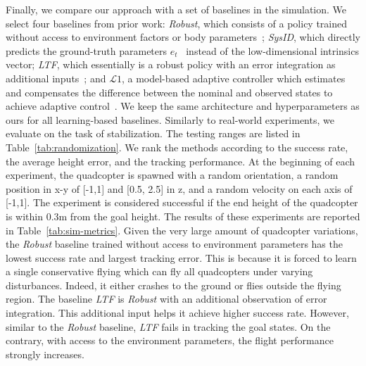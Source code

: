 Finally, we compare our approach with a set of baselines in the simulation.
%
We select four baselines from prior work: \emph{Robust}, which consists of a policy trained without access to environment factors or body parameters~\cite{tobin2017domain, peng2018sim}; \emph{SysID}, which directly predicts the ground-truth parameters $e_t$~\cite{SysID} instead of the low-dimensional intrinsics vector; \emph{LTF}, which essentially is a robust policy with an error integration as additional inputs~\cite{LTF}; and $\mathcal{L}1$, a model-based adaptive controller which estimates and compensates the difference between the nominal and observed states to achieve adaptive control~\cite{cao2008design,hovakimyan2010l1,hanover2021performance}. 
%
We keep the same architecture and hyperparameters as ours for all learning-based baselines. 
%
%
Similarly to real-world experiments, we evaluate on the task of stabilization. The testing ranges are listed in Table~\ref{tab:randomization}. We rank the methods according to the success rate, the average height error, and the tracking performance.
%
At the beginning of each experiment, the quadcopter is spawned with a random orientation, a random position in x-y of [-1,1] and [0.5, 2.5] in z, and a random velocity on each axis of [-1,1].
%
The experiment is considered successful if the end height of the quadcopter is within 0.3m from the goal height.
%
The results of these experiments are reported in Table~\ref{tab:sim-metrics}. 
%
Given the very large amount of quadcopter variations, the \emph{Robust} baseline trained without access to environment parameters has the lowest success rate and largest tracking error. This is because it is forced to learn a single conservative flying which can fly all quadcopters under varying disturbances.
%
Indeed, it either crashes to the ground or flies outside the flying region.
%
The baseline \emph{LTF} is \emph{Robust} with an additional observation of error integration. This additional input helps it achieve higher success rate. However, similar to the \emph{Robust} baseline, \emph{LTF} fails in tracking the goal states. 
%
On the contrary, with access to the environment parameters, the flight performance strongly increases.
%
